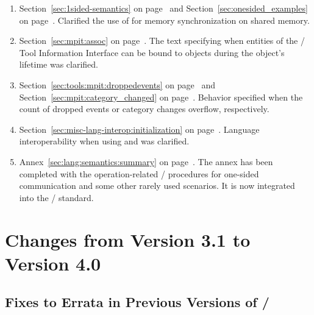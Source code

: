 \begin{enumerate}
\item
  Section~\ref{sec:1sided-semantics} on page~\pageref{sec:1sided-semantics} and
  Section~\ref{sec:onesided_examples} on page~\pageref{sec:onesided_examples}.
  \newline
  Clarified the use of  for memory synchronization on shared memory.

\item
  Section~\ref{sec:mpit:assoc} on page~\pageref{sec:mpit:assoc}.
  \newline
  The text specifying when entities of the \MPI/ Tool Information Interface can 
  be bound to objects during the object's lifetime was clarified.

\item
    Section~\ref{sec:tools:mpit:droppedevents} on page~\pageref{sec:tools:mpit:droppedevents} and
    Section~\ref{sec:mpit:category_changed} on page~\pageref{sec:mpit:category_changed}.
    \newline
    Behavior specified when the count of dropped events or category changes overflow, respectively.

\item
  Section~\ref{sec:misc-lang-interop:initialization} on page~\pageref{sec:misc-lang-interop:initialization}.
  \newline
  Language interoperability when using  and  was clarified.

\item
  Annex~\ref{sec:lang:semantics:summary} on page~\pageref{sec:lang:semantics:summary}.
  \newline
  The annex has been completed with the operation-related
  \MPI/ procedures for one-sided communication and some other rarely used scenarios.
  It is now integrated into the \MPI/ standard.

\end{enumerate}

\section{Changes from Version 3.1 to Version 4.0}
\label{subsec:31to40}

\subsection{Fixes to Errata in Previous Versions of \texorpdfstring{\MPI/}{MPI}}
\label{sec:changes-31-40-errata}

